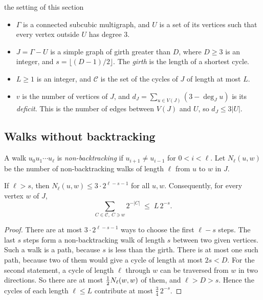 \documentclass[11pt]{article}
\begin{document}
\begin{notation}{the setting of this section}
\begin{itemize}[leftmargin=1.2em]
\item $\Gamma$ is a connected subcubic multigraph, and $U$ is a set of its vertices such that
every vertex outside $U$ has degree $3$.
\item $J=\Gamma-U$ is a simple graph of girth greater than $D$, where $D\ge3$ is an integer, and
$s=\lfloor(D-1)/2\rfloor$. The \emph{girth} is the length of a shortest cycle.
\item $L\ge1$ is an integer, and $\mathcal{C}$ is the set of the cycles of $J$ of length at most
$L$.
\item $v$ is the number of vertices of $J$, and $d_J=\sum_{u\in V(J)}(3-\deg_Ju)$ is its
\emph{deficit}. This is the number of edges between $V(J)$ and $U$, so $d_J\le3|U|$.
\end{itemize}
\end{notation}

\subsection{Walks without backtracking}

A walk $u_0u_1\cdots u_\ell$ is \emph{non-backtracking} if $u_{i+1}\ne u_{i-1}$ for $0<i<\ell$. Let
$N_\ell(u,w)$ be the number of non-backtracking walks of length $\ell$ from $u$ to $w$ in $J$.

\begin{lemma}\label{lem:walks}
If $\ell>s$, then $N_\ell(u,w)\le3\cdot2^{\ell-s-1}$ for all $u,w$. Consequently, for every vertex
$w$ of $J$,
\begin{equation}\label{eq:load}
  \sum_{C\in\mathcal{C},\ C\ni w}2^{-|C|}\;\le\;L\,2^{-s}.
\end{equation}
\end{lemma}

\begin{proof}
There are at most $3\cdot2^{\ell-s-1}$ ways to choose the first $\ell-s$ steps. The last $s$ steps
form a non-backtracking walk of length $s$ between two given vertices. Such a walk is a path,
because $s$ is less than the girth. There is at most one such path, because two of them would give
a cycle of length at most $2s<D$. For the second statement, a cycle of length $\ell$ through $w$
can be traversed from $w$ in two directions. So there are at most $\tfrac12 N_\ell(w,w)$ of them, and
$\ell>D>s$. Hence the cycles of each length $\ell\le L$ contribute at most $\frac34\,2^{-s}$.
\end{proof}
\end{document}

